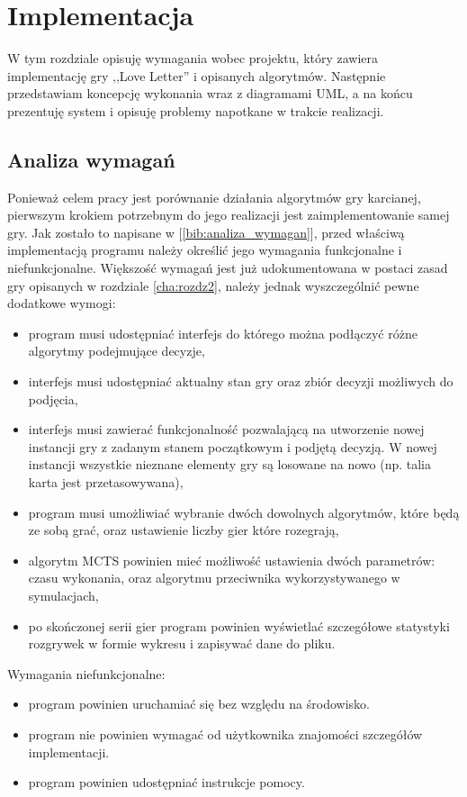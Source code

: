 \chapter{Implementacja}
\label{cha:rozdz4}

W tym rozdziale opisuję wymagania wobec projektu, który zawiera implementację gry ,,Love Letter'' i opisanych algorytmów. Następnie przedstawiam koncepcję wykonania wraz z diagramami UML, a na końcu prezentuję system i opisuję problemy napotkane w trakcie realizacji.

\section{Analiza wymagań}
Ponieważ celem pracy jest porównanie działania algorytmów gry karcianej, pierwszym krokiem potrzebnym do jego realizacji jest zaimplementowanie samej gry. Jak zostało to napisane w [\ref{bib:analiza_wymagan}], przed właściwą implementacją programu należy określić jego wymagania funkcjonalne i niefunkcjonalne. Większość wymagań jest już udokumentowana w postaci zasad gry opisanych w rozdziale \ref{cha:rozdz2}, należy jednak wyszczególnić pewne dodatkowe wymogi:
\begin{itemize}
	\item program musi udostępniać interfejs do którego można podłączyć różne algorytmy podejmujące decyzje,
	\item interfejs musi udostępniać aktualny stan gry oraz zbiór decyzji możliwych do podjęcia,
	\item interfejs musi zawierać funkcjonalność pozwalającą na utworzenie nowej instancji gry z zadanym stanem początkowym i podjętą decyzją. W nowej instancji wszystkie nieznane elementy gry są losowane na nowo (np. talia karta jest przetasowywana),
	\item program musi umożliwiać wybranie dwóch dowolnych algorytmów, które będą ze sobą grać, oraz ustawienie liczby gier które rozegrają,
	\item algorytm MCTS powinien mieć możliwość ustawienia dwóch parametrów: czasu wykonania, oraz algorytmu przeciwnika wykorzystywanego w symulacjach,
	\item po skończonej serii gier program powinien wyświetlać szczegółowe statystyki rozgrywek w formie wykresu i zapisywać dane do pliku.
\end{itemize}
Wymagania niefunkcjonalne:
\begin{itemize}
	\item program powinien uruchamiać się bez względu na środowisko.
	\item program nie powinien wymagać od użytkownika znajomości szczegółów implementacji.
	\item program powinien udostępniać instrukcje pomocy.
\end{itemize}
